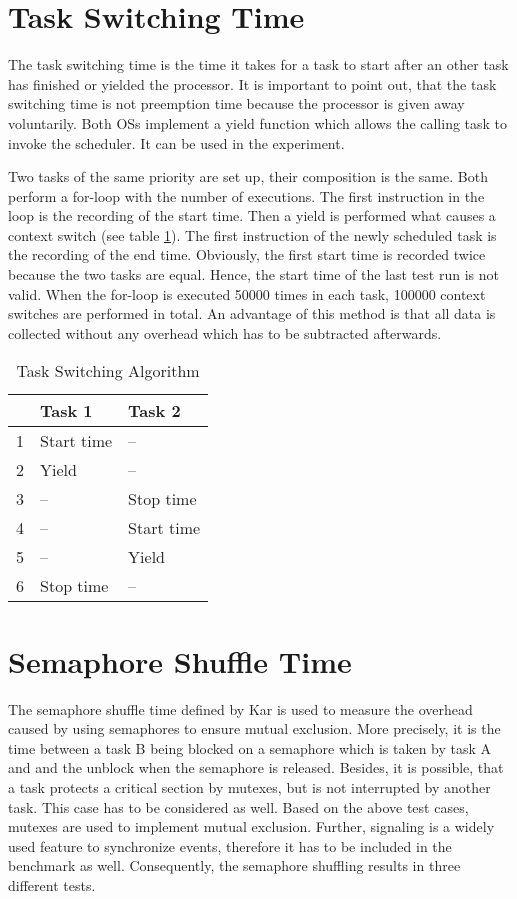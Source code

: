 \section{Task Switching Time} 
The task switching time is the time it takes for a task to start after an other task has finished or yielded the processor.
It is important to point out, that the task switching time is not preemption time because the processor is given away voluntarily.
Both \acp{OS} implement a yield function which allows the calling task to invoke the scheduler.
It can be used in the experiment.
\par
Two tasks of the same priority are set up, their composition is the same. 
Both perform a for-loop with the number of executions.
The first instruction in the loop is the recording of the start time.
Then a yield is performed what causes a context switch (see table \ref{tab_task_switching}). 
The first instruction of the newly scheduled task is the recording of the end time.
Obviously, the first start time is recorded twice because the two tasks are equal.
Hence, the start time of the last test run is not valid.
When the for-loop is executed 50000 times in each task, 100000 context switches are performed in total.
An advantage of this method is that all data is collected without any overhead which has to be subtracted afterwards.

\begin{table}[htbp]
	\centering
		\begin{tabular}{|l|l|l|}
			\hline
				& Task 1							& Task 2						\\
				\hline 
			  1 & Start time					& --								\\
			  2 & Yield								& --								\\
			  3 & --									& Stop time					\\ 
			  4 & --									& Start time				\\
			  5 & --									& Yield							\\
			  6 & Stop time						& --								\\ 			  
			\hline
		\end{tabular}
	\caption{Task Switching Algorithm}
	\label{tab_task_switching}
\end{table}
 
\section{Semaphore Shuffle Time}
The semaphore shuffle time defined by Kar is used to measure the overhead caused by using semaphores to ensure mutual exclusion.
More precisely, it is the time between a task B being blocked on a semaphore which is taken by task A and and the unblock when the semaphore is released.  
Besides, it is possible, that a task protects a critical section by mutexes, but is not interrupted by another task.
This case has to be considered as well.
Based on the above test cases, mutexes are used to implement mutual exclusion.
Further, signaling is a widely used feature to synchronize events, therefore it has to be included in the benchmark as well.  
Consequently, the semaphore shuffling results in three different tests.

